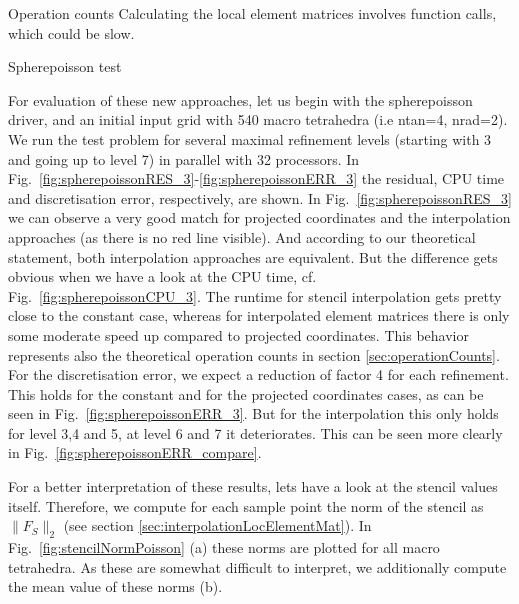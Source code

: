 \documentclass[a4paper,11pt,reqno]{amsart}
\numberwithin{figure}{section}
\numberwithin{table}{section}
\numberwithin{figure}{section}
\begin{document}
\begin{section}{Operation counts}
Calculating the local element matrices involves function calls, which could be slow.\\

\end{section}







\begin{section}{Spherepoisson test}



For evaluation of these new approaches, let us begin with the spherepoisson driver, 
and an initial input grid with 
540 macro tetrahedra (i.e ntan=4, nrad=2). We run the test problem for several
maximal refinement levels (starting with 3 and going up to level 7) in parallel
with 32 processors. In Fig.~\ref{fig:spherepoissonRES_3}-\ref{fig:spherepoissonERR_3}
the residual, CPU time and discretisation error, respectively, are shown.
In Fig.~\ref{fig:spherepoissonRES_3} we can observe a very good match for
projected coordinates and the interpolation
approaches (as there is no red line visible).
And according to our theoretical statement, both interpolation approaches are
equivalent. But the difference gets obvious when we have a look at the CPU time,
cf. Fig.~\ref{fig:spherepoissonCPU_3}. The runtime for stencil interpolation
gets pretty close to the constant case, whereas for interpolated element matrices
there is only some moderate speed up compared to projected coordinates.
This behavior represents also the theoretical operation counts in section 
\ref{sec:operationCounts}.
For the discretisation error, we expect a reduction
of factor 4 for each refinement. This holds for the constant and for the projected
coordinates cases, as can be seen in Fig.~\ref{fig:spherepoissonERR_3}. But for
the interpolation this only holds for level 3,4 and 5, at level 6 and 7 it deteriorates.
This can be seen more clearly in Fig.~\ref{fig:spherepoissonERR_compare}.

For a better interpretation of these results, lets have a look at the stencil values itself.
Therefore, we compute for each sample point the norm of the stencil as $\|F_S\|_2$ 
(see section \ref{sec:interpolationLocElementMat}).
In Fig.~\ref{fig:stencilNormPoisson} (a) these norms are plotted for all macro tetrahedra.
As these are somewhat difficult to interpret, we additionally compute the mean value
of these norms (b). 


\end{section}
\end{document}
